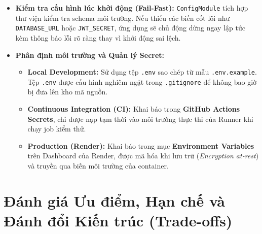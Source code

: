\documentclass[11pt, a4paper]{article}
\begin{document}
\begin{itemize}
	\item \textbf{Kiểm tra cấu hình lúc khởi động (Fail-Fast):} \texttt{ConfigModule} tích hợp thư viện kiểm tra schema môi trường. Nếu thiếu các biến cốt lõi như \texttt{DATABASE\_URL} hoặc \texttt{JWT\_SECRET}, ứng dụng sẽ chủ động dừng ngay lập tức kèm thông báo lỗi rõ ràng thay vì khởi động sai lệch.
	\item \textbf{Phân định môi trường và Quản lý Secret:}
	      \begin{itemize}
		      \item \textbf{Local Development:} Sử dụng tệp \texttt{.env} sao chép từ mẫu \texttt{.env.example}. Tệp \texttt{.env} được cấu hình nghiêm ngặt trong \texttt{.gitignore} để không bao giờ bị đưa lên kho mã nguồn.
		      \item \textbf{Continuous Integration (CI):} Khai báo trong \textbf{GitHub Actions Secrets}, chỉ được nạp tạm thời vào môi trường thực thi của Runner khi chạy job kiểm thử.
		      \item \textbf{Production (Render):} Khai báo trong mục \textbf{Environment Variables} trên Dashboard của Render, được mã hóa khi lưu trữ (\textit{Encryption at-rest}) và truyền qua biến môi trường của container.
	      \end{itemize}
\end{itemize}

\section{Đánh giá Ưu điểm, Hạn chế và Đánh đổi Kiến trúc (Trade-offs)}
\end{document}
